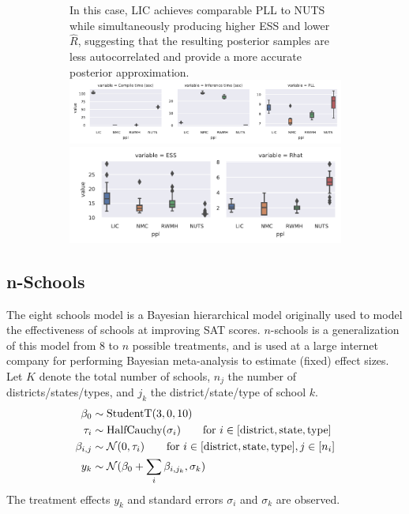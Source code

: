 \documentclass[twoside]{article}
\begin{document}
\begin{figure}
\begin{subfigure}[b]{\textwidth}
{      In this case, LIC achieves comparable PLL to NUTS while simultaneously producing
      higher ESS and lower $\widehat{R}$, suggesting that the resulting posterior samples
      are less autocorrelated and provide a more accurate posterior approximation.
    }\label{fig:nschools}
    \includegraphics[width=\linewidth]{Figures/nschools_pll_type1.pdf}
    \includegraphics[width=0.66\linewidth]{Figures/nschools_ess_rhat_type1.pdf}
  \end{subfigure}
\end{figure}


\subsection{n-Schools}
\label{ssec:nschools}

The eight schools model \citep{rubin1981estimation} is a Bayesian
hierarchical model originally used to model the effectiveness of schools at
improving SAT scores. $n$-schools is a generalization of this model from $8$
to $n$ possible treatments, and is used at a large internet company for
performing Bayesian meta-analysis \cite{sutton2001bayesian} to estimate
(fixed) effect sizes.
Let $K$ denote the total number of schools, $n_j$ the number of
districts/states/types, and $j_k$ the district/state/type of school $k$.
\begin{align*}
  \beta_0     & \sim \text{StudentT}(3, 0, 10)                                                                         \\
  \tau_{i}    & \sim \text{HalfCauchy}(\sigma_i) \qquad \text{for}~i \in [\text{district}, \text{state}, \text{type}]  \\
  \beta_{i,j} & \sim \mathcal{N}(0, \tau_i)  \qquad \text{for}~i \in [\text{district}, \text{state}, \text{type}], j \in [n_i] \\
  y_k         & \sim \mathcal{N}(\beta_0 + \sum_i \beta_{i,j_k}, \sigma_k)
\end{align*}
The treatment effects $y_k$ and standard errors $\sigma_i$ and $\sigma_k$ are observed.
\end{document}

